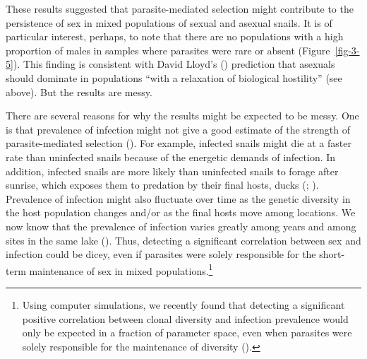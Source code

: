 \documentclass[
  american,
  letterpaper,
]{book}
\begin{document}
These results suggested that parasite-mediated selection might
contribute to the persistence of sex in mixed populations of sexual and
asexual snails. It is of particular interest, perhaps, to note that
there are no populations with a high proportion of males in samples
where parasites were rare or absent (Figure~\ref{fig-3-5}). This finding
is consistent with David Lloyd's ()
prediction that asexuals should dominate in populations ``with a
relaxation of biological hostility'' (see above). But the results are
messy.

There are several reasons for why the results might be expected to be
messy. One is that prevalence of infection might not give a good
estimate of the strength of parasite-mediated selection
(). For example, infected snails
might die at a faster rate than uninfected snails because of the
energetic demands of infection. In addition, infected snails are more
likely than uninfected snails to forage after sunrise, which exposes
them to predation by their final hosts, ducks
(;
). Prevalence of
infection might also fluctuate over time as the genetic diversity in the
host population changes and/or as the final hosts move among locations.
We now know that the prevalence of infection varies greatly among years
and among sites in the same lake (). Thus, detecting a significant correlation between
sex and infection could be dicey, even if parasites were solely
responsible for the short-term maintenance of sex in mixed
populations.\footnote{Using computer simulations, we recently found that
  detecting a significant positive correlation between clonal diversity
  and infection prevalence would only be expected in a fraction of
  parameter space, even when parasites were solely responsible for the
  maintenance of diversity ().}
\end{document}
